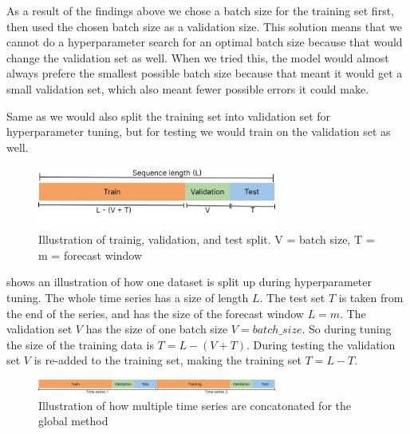 As a result of the findings above we chose a batch size for the training set first, then
used the chosen batch size as a validation size.
This solution means that we cannot do a hyperparameter search for an optimal batch size
because that would change the validation set as well. When we tried this, the model would
almost always prefere the smallest possible batch size because that meant it would get a
small validation set, which also meant fewer possible errors it could make.

Same as \cite[]{Hewamalage2021} we would also split the training set into validation set for
hyperparameter tuning, but for testing we would train on the validation set as well.



\begin{figure}[h!]
  \centering
  \includegraphics[width=0.7\textwidth]{./figs/illustrations/illustration_train_val_test_split.png}
  \hfill
  \caption{Illustration of trainig, validation, and test split. V = batch size, T = m = forecast window}
  \label{fig:train-val-test-split}
\end{figure}

 shows an illustration of how one dataset is split up during
hyperparameter tuning.
The whole time series has a size of length $L$. The test set $T$ is taken from the end of the series,
and has the size of the forecast window $L = m$. The validation set $V$ has the size of
one batch size $V=batch\_size$. So during tuning the size of the training data is
$T = L - (V + T)$. During testing the validation set $V$ is re-added to the training set,
making the training set $T = L - T$.

\begin{figure}[h!]
  \centering
  \includegraphics[width=0.7\textwidth]{./figs/illustrations/illustration_global_time_series.png}
  \hfill
  \caption{Illustration of how multiple time series are concatonated for the global method}
  \label{fig:global-time-series}
\end{figure}

